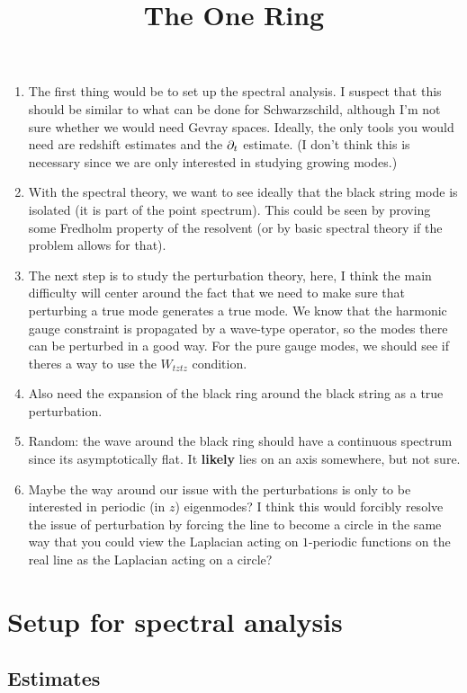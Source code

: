 \documentclass{article}
\title{The One Ring}
\date{}
\begin{document}
\maketitle

\begin{enumerate}
\item The first thing would be to set up the spectral analysis. I
  suspect that this should be similar to what can be done for
  Schwarzschild, although I'm not sure whether we would need Gevray
  spaces. Ideally, the only tools you would need are redshift
  estimates and the $\partial_t$ estimate. (I don't think this is necessary
  since we are only interested in studying growing modes.)
\item With the spectral theory, we want to see ideally that the black
  string mode is isolated (it is part of the point spectrum). This
  could be seen by proving some Fredholm property of the resolvent (or
  by basic spectral theory if the problem allows for that).
\item The next step is to study the perturbation theory, here, I think
  the main difficulty will center around the fact that we need to make
  sure that perturbing a true mode generates a true mode. We know that
  the harmonic gauge constraint is propagated by a wave-type operator,
  so the modes there can be perturbed in a good way. For the pure
  gauge modes, we should see if theres a way to use the $W_{tztz}$
  condition.
\item Also need the expansion of the black ring around the black
  string as a true perturbation.
\item Random: the wave around the black ring should have a continuous
  spectrum since its asymptotically flat. It \textbf{likely} lies on
  an axis somewhere, but not sure.
\item Maybe the way around our issue with the perturbations is only to
  be interested in periodic (in $z$) eigenmodes? I think this would
  forcibly resolve the issue of perturbation by forcing the line to
  become a circle in the same way that you could view the Laplacian
  acting on $1$-periodic functions on the real line as the Laplacian
  acting on a circle? 
\end{enumerate}

\section{Setup for spectral analysis}

\subsection{Estimates}
\end{document}
